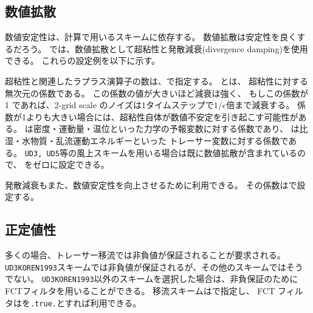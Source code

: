 \subsection{数値拡散}

数値安定性は、計算で用いるスキームに依存する。
数値拡散は安定性を良くするだろう。
\scalerm では、数値拡散として超粘性と発散減衰(divergence damping)を使用できる。
これらの設定例を以下に示す。

超粘性と関連したラプラス演算子の数は、で指定する。
とは、
超粘性に対する無次元の係数である。
この係数の値が大きいほど減衰は強く、
もしこの係数が 1 であれば、2-grid scale のノイズは1タイムステップで$1/e$倍まで減衰する。
係数が1よりも大きい場合には、超粘性自体が数値不安定を引き起こす可能性がある。
は密度・運動量・温位といった力学の予報変数に対する係数であり、
は比湿・水物質・乱流運動エネルギーといった
トレーサー変数に対する係数である。
\verb|UD3, UD5|等の風上スキームを用いる場合は既に数値拡散が含まれているので、
をゼロに設定できる。

発散減衰もまた、数値安定性を向上させるために利用できる。
その係数はで設定する。

\subsection{正定値性}

多くの場合、トレーサー移流では非負値が保証されることが要求される。
\verb|UD3KOREN1993|スキームでは非負値が保証されるが、その他のスキームではそうでない。
\verb|UD3KOREN1993|以外のスキームを選択した場合は、非負保証のためにFCTフィルタを用いることができる。
移流スキームはで指定し、
FCT フィルタはを\verb|.true.|とすれば利用できる。

